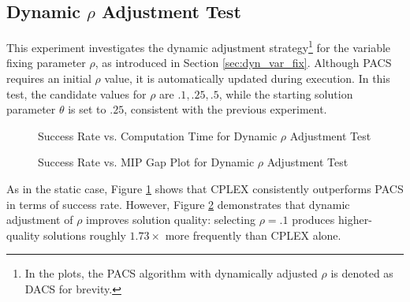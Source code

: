 \subsection{Dynamic $\rho$ Adjustment Test}\label{sec:test_dyn_rho}
This experiment investigates the dynamic adjustment strategy\footnote{In the plots, the PACS algorithm with dynamically adjusted $\rho$ is denoted as DACS for brevity.} for the variable fixing parameter $\rho$, as introduced in Section \ref{sec:dyn_var_fix}. Although PACS requires an initial $\rho$ value, it is automatically updated during execution. In this test, the candidate values for $\rho$ are ${.1, .25, .5}$, while the starting solution parameter $\theta$ is set to $.25$, consistent with the previous experiment.
\begin{figure}[H]
\centering
\begin{minipage}{0.6\columnwidth}
\centering
\resizebox{\linewidth}{!}{}
\end{minipage}%
\hfill
\begin{minipage}{0.4\columnwidth}
\centering
\resizebox{\linewidth}{!}{}
\end{minipage}
\caption{Success Rate vs. Computation Time for Dynamic $\rho$ Adjustment Test}
\label{fig:PACS_DYN_SuccRate}
\end{figure}

\begin{figure}[H]
\centering
\begin{minipage}{0.6\columnwidth}
\centering
\resizebox{\linewidth}{!}{}
\end{minipage}%
\hfill
\begin{minipage}{0.4\columnwidth}
\centering
\resizebox{\linewidth}{!}{}
\end{minipage}
\caption{Success Rate vs. MIP Gap Plot for Dynamic $\rho$ Adjustment Test}
\label{fig:PACS_DYN_MGAP}
\end{figure}

As in the static case, Figure \ref{fig:PACS_DYN_SuccRate} shows that CPLEX consistently outperforms PACS in terms of success rate. However, Figure \ref{fig:PACS_DYN_MGAP} demonstrates that dynamic adjustment of $\rho$ improves solution quality: selecting $\rho = .1$ produces higher-quality solutions roughly $1.73\times$ more frequently than CPLEX alone.

